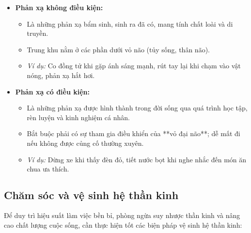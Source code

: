 \begin{itemize}
    \item \textbf{Phản xạ không điều kiện:}
    \begin{itemize}
        \item Là những phản xạ bẩm sinh, sinh ra đã có, mang tính chất loài và di truyền.
        \item Trung khu nằm ở các phần dưới vỏ não (tủy sống, thân não).
        \item \textit{Ví dụ:} Co đồng tử khi gặp ánh sáng mạnh, rút tay lại khi chạm vào vật nóng, phản xạ hắt hơi.
    \end{itemize}

    \item \textbf{Phản xạ có điều kiện:}
    \begin{itemize}
        \item Là những phản xạ được hình thành trong đời sống qua quá trình học tập, rèn luyện và kinh nghiệm cá nhân.
        \item Bắt buộc phải có sự tham gia điều khiển của **vỏ đại não**; dễ mất đi nếu không được củng cố thường xuyên.
        \item \textit{Ví dụ:} Dừng xe khi thấy đèn đỏ, tiết nước bọt khi nghe nhắc đến món ăn chua ưa thích.
    \end{itemize}
\end{itemize}

\subsection{Chăm sóc và vệ sinh hệ thần kinh}

Để duy trì hiệu suất làm việc bền bỉ, phòng ngừa suy nhược thần kinh và nâng cao chất lượng cuộc sống, cần thực hiện tốt các biện pháp vệ sinh hệ thần kinh:

